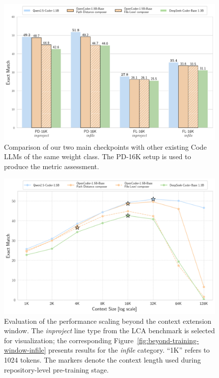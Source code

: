 \begin{figure}[ht]
    \centering
    \includegraphics[width=\textwidth]{figures/model-comparison.pdf}
    \caption{Comparison of our two main checkpoints with other existing Code LLMs of the same weight class. The PD-16K setup is used to produce the metric assessment.}\label{fig:model-comparison}
\end{figure}

\begin{figure}[ht]
    \centering
    \includegraphics[width=\textwidth]{figures/beyond-training-window-inproject.pdf}
    \caption{Evaluation of the performance 
    scaling beyond the context extension 
    window. The \textit{inproject} line type from the LCA benchmark is selected for visualization; the corresponding Figure~\ref{fig:beyond-training-window-infile} presents results for the \textit{infile} category. ``1K'' refers to 1024 tokens. The \raisebox{-0.3ex}{\FiveStarOpen} markers denote the context length used during repository-level pre-training stage.}\label{fig:beyond-training-window-inproject}
\end{figure}

